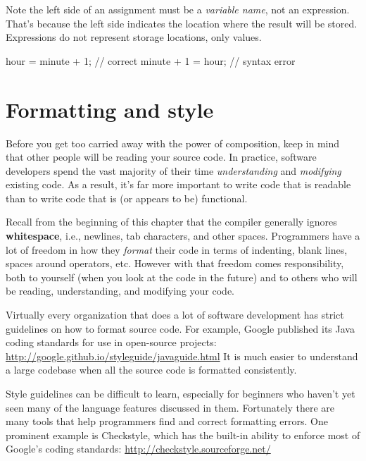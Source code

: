 Note the left side of an assignment must be a {\em variable name}, not an expression.
That's because the left side indicates the location where the result will be stored.
Expressions do not represent storage locations, only values.

\begin{code}
    hour = minute + 1;  // correct
    minute + 1 = hour;  // syntax error
\end{code}


\section{Formatting and style}


Before you get too carried away with the power of composition, keep in mind that other people will be reading your source code.
In practice, software developers spend the vast majority of their time {\em understanding} and {\em modifying} existing code.
As a result, it's far more important to write code that is readable than to write code that is (or appears to be) functional.


Recall from the beginning of this chapter that the compiler generally ignores {\bf whitespace}, i.e., newlines, tab characters, and other spaces.
Programmers have a lot of freedom in how they {\em format} their code in terms of indenting, blank lines, spaces around operators, etc.
However with that freedom comes responsibility, both to yourself (when you look at the code in the future) and to others who will be reading, understanding, and modifying your code.

Virtually every organization that does a lot of software development has strict guidelines on how to format source code.
For example, Google published its Java coding standards for use in open-source projects:
\url{http://google.github.io/styleguide/javaguide.html}
It is much easier to understand a large codebase when all the source code is formatted consistently.

Style guidelines can be difficult to learn, especially for beginners who haven't yet seen many of the language features discussed in them.
Fortunately there are many tools that help programmers find and correct formatting errors.
One prominent example is Checkstyle, which has the built-in ability to enforce most of Google's coding standards:
\url{http://checkstyle.sourceforge.net/}

